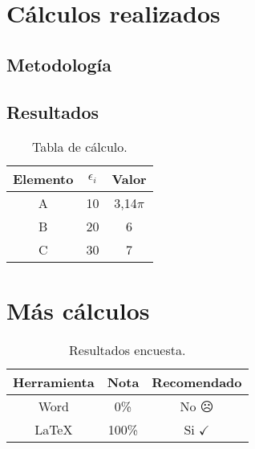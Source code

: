 \newpage
\begin{anexo}
	\section{Cálculos realizados}

		\subsection{Metodología}
			\lipsum[1]
			
		
		\subsection{Resultados}
			\lipsum[10]
			
			\begin{table}[htbp]
				\centering
				\caption{Tabla de cálculo.}
				\begin{tabular}{ccc}
					\hline
					\textbf{Elemento} & $\epsilon_i$ & \boldmath{}\textbf{Valor}\unboldmath{} \bigstrut\\
					\hline
					A     & 10    & 3,14$\pi$ \bigstrut[t]\\
					B     & 20    & 6 \\
					C     & 30    & 7 \\
					\end{tabular}
				\label{tab:anexo-1}
			\end{table}
	
	\newpage
	\section{Más cálculos}
	
		\lipsum[1]\newp\lipsum[4]
		
		\begin{table}[htbp]
			\centering
			\caption{Resultados encuesta.}
			\begin{tabular}{ccc}
				\hline
				\textbf{Herramienta} & \textbf{Nota} & \textbf{Recomendado} \bigstrut\\
				\hline
				Word  & 0\%   & No $\frownie$\\
				\LaTeX & 100\% & Si $\checkmark$ \\
			\end{tabular}
			\label{tab:anexo-2}
		\end{table}
		
\end{anexo}

